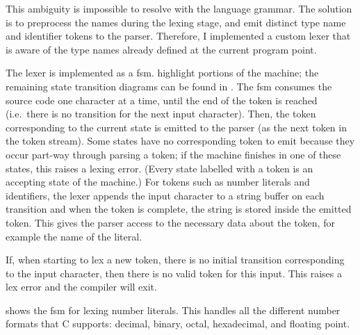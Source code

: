 \documentclass[00-main.tex]{subfiles}
\begin{document}
This ambiguity is impossible to resolve with the language grammar. The solution is to preprocess the  names during the lexing stage, and emit distinct type name and identifier tokens to the parser.
Therefore, I implemented a custom lexer that is aware of the type names already defined at the current program point.

The lexer is implemented as a \gls{fsm}.  highlight portions of the machine; the remaining state transition diagrams can be found in .
The \gls{fsm} consumes the source code one character at a time, until the end of the token is reached (i.e.\ there is no transition for the next input character).
Then, the token corresponding to the current state is emitted to the parser (as the next token in the token stream).
Some states have no corresponding token to emit because they occur part-way through parsing a token; if the machine finishes in one of these states, this raises a lexing error.
(Every state labelled with a token is an accepting state of the machine.)
For tokens such as number literals and identifiers, the lexer appends the input character to a string buffer on each transition and when the token is complete, the string is stored inside the emitted token.
This gives the parser access to the necessary data about the token, for example the name of the literal.

If, when starting to lex a new token, there is no initial transition corresponding to the input character, then there is no valid token for this input. This raises a lex error and the compiler will exit.

 shows the \gls{fsm} for lexing number literals. This handles all the different number formats that C supports: decimal, binary, octal, hexadecimal, and floating point.
\end{document}
